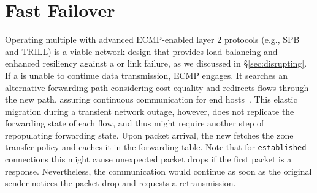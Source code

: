 
\section{Fast Failover}
\label{sec:ecmp}
Operating multiple \tps with advanced ECMP-enabled layer 2 protocols (e.g., SPB and
TRILL) is a viable network design that provides load balancing and enhanced resiliency
against a \tp or link failure, as we discussed in \S\ref{sec:disrupting}.
If a \tp is unable to continue data transmission, ECMP engages. It searches an alternative
forwarding path considering cost equality and redirects flows through the new path, assuring
continuous communication for end hosts~\cite{rfc6754}.
This elastic migration during a transient network outage, however, does not replicate the
forwarding state of each flow, and thus might require another step of repopulating
forwarding state. Upon packet arrival, the new \tp fetches the zone transfer policy
and caches it in the forwarding table. Note that for \texttt{established} connections this might
cause unexpected packet drops if the first packet is a response. Nevertheless, the
communication would continue as soon as the original sender notices the packet drop
and requests a retransmission.







